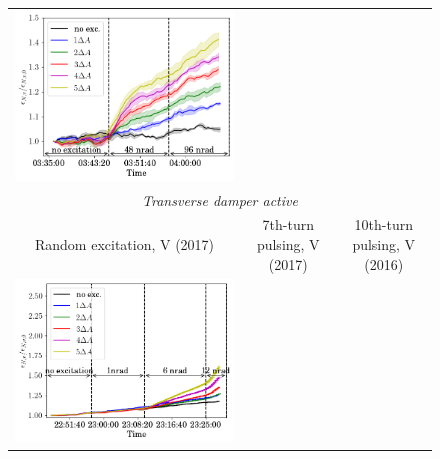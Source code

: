 \documentclass[
prstab
,reprint
,linenumbers
,longbibliography
,preprintnumbers
,showkeys
,amsfonts,amssymb,amsmath
,floatfix
]{revtex4-1}
\newcommand{\seventhtp}{7th-turn pulsing}
\newcommand{\tenthtp}{10th-turn pulsing}
\newlength{\thirdwidth}
\begin{document}
\begin{figure}
\begin{tabular}{ccc}
    \includegraphics[width=\thirdwidth]{2016_emitv_avg_rel_v10th_no_damper_no_text.png}\\
    \multicolumn{3}{c}{\emph{Transverse damper active}} \\
    Random excitation, V (2017) & \seventhtp, V (2017) & \tenthtp, V
                                                         (2016) \\
    \includegraphics[width=\thirdwidth]{2017_emitv_avg_rel_vran_with_damper.png} &

\end{tabular}
\end{figure}
\end{document}
